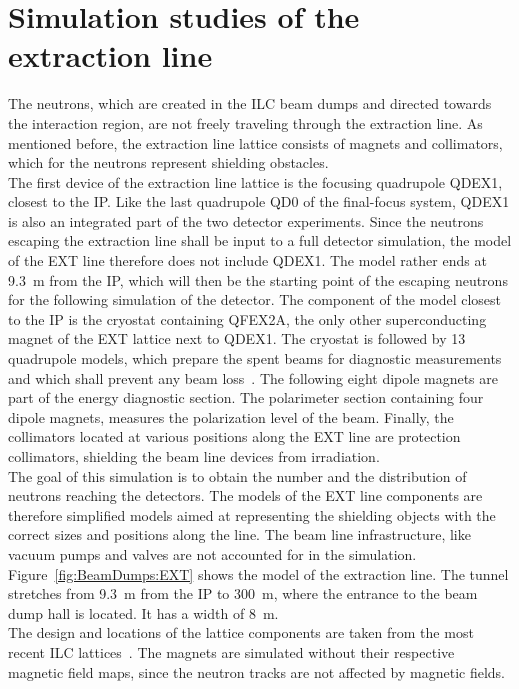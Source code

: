\clearpage
\section{Simulation studies of the extraction line}
\label{BeamDumps:sim_EXT}

The neutrons, which are created in the ILC beam dumps and directed towards the interaction region, are not freely traveling through the extraction line.
As mentioned before, the extraction line lattice consists of magnets and collimators, which for the neutrons represent shielding obstacles.
\\The first device of the extraction line lattice is the focusing quadrupole QDEX1, closest to the IP.
Like the last quadrupole QD0 of the final-focus system, QDEX1 is also an integrated part of the two detector experiments.
Since the neutrons escaping the extraction line shall be input to a full detector simulation, the \fluka model of the EXT line therefore does not include QDEX1.
The model rather ends at \SI{9.3}{\meter} from the IP, which will then be the starting point of the escaping neutrons for the following \geant simulation of the \sid detector.
The component of the \fluka model closest to the IP is the cryostat containing QFEX2A, the only other superconducting magnet of the EXT lattice next to QDEX1.
The cryostat is followed by 13 quadrupole models, which prepare the spent beams for diagnostic measurements and which shall prevent any beam loss~\cites[p. 139 ff]{TDR32}{EXT_design, EXT_design2}.
The following eight dipole magnets are part of the energy diagnostic section.
The polarimeter section containing four dipole magnets, measures the polarization level of the beam.
Finally, the collimators located at various positions along the EXT line are protection collimators, shielding the beam line devices from irradiation.
\\The goal of this \fluka simulation is to obtain the number and the distribution of neutrons reaching the detectors.
The models of the EXT line components are therefore simplified models aimed at representing the shielding objects with the correct sizes and positions along the line.
The beam line infrastructure, like vacuum pumps and valves are not accounted for in the simulation.
Figure~\ref{fig:BeamDumps:EXT} shows the \fluka model of the extraction line.
The tunnel stretches from \SI{9.3}{\meter} from the IP to \SI{300}{\meter}, where the entrance to the beam dump hall is located.
It has a width of \SI{8}{\meter}.
\\The design and locations of the lattice components are taken from the most recent ILC lattices~\cite{EXT_lattice,EXT_lattice2}.
The magnets are simulated without their respective magnetic field maps, since the neutron tracks are not affected by magnetic fields.

